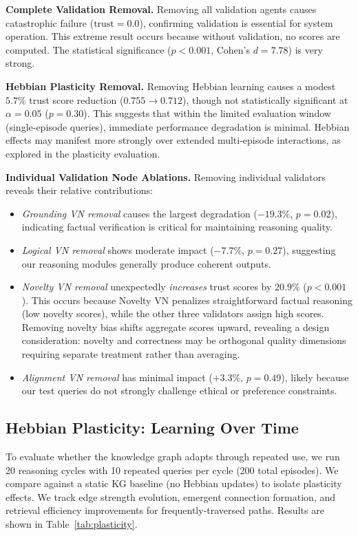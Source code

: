 \documentclass{article}
\begin{document}
\textbf{Complete Validation Removal.} Removing all validation agents causes catastrophic failure ($\text{trust} = 0.0$), confirming validation is essential for system operation. This extreme result occurs because without validation, no scores are computed. The statistical significance ($p < 0.001$, Cohen's $d = 7.78$) is very strong.

\textbf{Hebbian Plasticity Removal.} Removing Hebbian learning causes a modest $5.7\%$ trust score reduction ($0.755 \to 0.712$), though not statistically significant at $\alpha = 0.05$ ($p = 0.30$). This suggests that within the limited evaluation window (single-episode queries), immediate performance degradation is minimal. Hebbian effects may manifest more strongly over extended multi-episode interactions, as explored in the plasticity evaluation.

\textbf{Individual Validation Node Ablations.} Removing individual validators reveals their relative contributions:

\begin{itemize}
    \item \textit{Grounding VN removal} causes the largest degradation ($-19.3\%$, $p = 0.02$), indicating factual verification is critical for maintaining reasoning quality.
    \item \textit{Logical VN removal} shows moderate impact ($-7.7\%$, $p = 0.27$), suggesting our reasoning modules generally produce coherent outputs.
    \item \textit{Novelty VN removal} unexpectedly \textit{increases} trust scores by $20.9\%$ ($p < 0.001$). This occurs because Novelty VN penalizes straightforward factual reasoning (low novelty scores), while the other three validators assign high scores. Removing novelty bias shifts aggregate scores upward, revealing a design consideration: novelty and correctness may be orthogonal quality dimensions requiring separate treatment rather than averaging.
    \item \textit{Alignment VN removal} has minimal impact ($+3.3\%$, $p = 0.49$), likely because our test queries do not strongly challenge ethical or preference constraints.
\end{itemize}

\subsection{Hebbian Plasticity: Learning Over Time}

To evaluate whether the knowledge graph adapts through repeated use, we run 20 reasoning cycles with 10 repeated queries per cycle (200 total episodes). We compare against a static KG baseline (no Hebbian updates) to isolate plasticity effects. We track edge strength evolution, emergent connection formation, and retrieval efficiency improvements for frequently-traversed paths. Results are shown in Table~\ref{tab:plasticity}.
\end{document}

